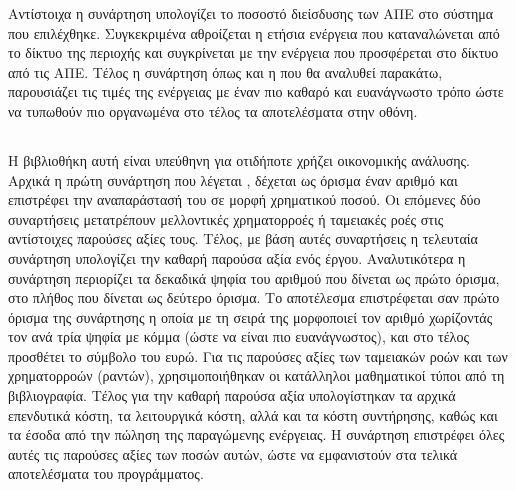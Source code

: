 \documentclass[12pt]{report}
\begin{document}
Αντίστοιχα η συνάρτηση {\textbf{{}}} υπολογίζει το ποσοστό διείσδυσης των ΑΠΕ στο σύστημα που επιλέχθηκε. Συγκεκριμένα αθροίζεται η ετήσια ενέργεια που καταναλώνεται από το δίκτυο της περιοχής
και συγκρίνεται με την ενέργεια που προσφέρεται στο δίκτυο από τις ΑΠΕ. Τέλος η συνάρτηση {\textbf{{}}} όπως και η {\textbf{{}}} που θα αναλυθεί παρακάτω, παρουσιάζει τις τιμές της ενέργειας
με έναν πιο καθαρό και ευανάγνωστο τρόπο ώστε να τυπωθούν πιο οργανωμένα στο τέλος τα αποτελέσματα στην οθόνη.

{}

\subsection{{}}
Η βιβλιοθήκη αυτή είναι υπεύθηνη για οτιδήποτε χρήζει οικονομικής ανάλυσης. Αρχικά η πρώτη συνάρτηση που λέγεται {\textbf{{}}}, δέχεται ως όρισμα έναν αριθμό και επιστρέφει την αναπαράστασή του σε μορφή χρηματικού 
ποσού. Οι επόμενες δύο συναρτήσεις μετατρέπουν μελλοντικές χρηματορροές ή ταμειακές ροές στις αντίστοιχες παρούσες αξίες τους. Τέλος, με βάση αυτές συναρτήσεις η τελευταία συνάρτηση υπολογίζει την καθαρή παρούσα αξία ενός έργου.
Αναλυτικότερα η συνάρτηση {} περιορίζει τα δεκαδικά ψηφία του αριθμού που δίνεται ως πρώτο όρισμα, στο πλήθος που δίνεται ως δεύτερο όρισμα. Το αποτέλεσμα επιστρέφεται σαν πρώτο όρισμα της συνάρτησης
{} η οποία με τη σειρά της μορφοποιεί τον αριθμό χωρίζοντάς τον ανά τρία ψηφία με κόμμα (ώστε να είναι πιο ευανάγνωστος), και στο τέλος προσθέτει το σύμβολο του ευρώ. Για τις παρούσες αξίες των ταμειακών ροών και
των χρηματορροών (ραντών), χρησιμοποιήθηκαν οι κατάλληλοι μαθηματικοί τύποι από τη βιβλιογραφία. Τέλος για την καθαρή παρούσα αξία υπολογίστηκαν τα αρχικά επενδυτικά κόστη, τα λειτουργικά κόστη, αλλά και τα κόστη συντήρησης, καθώς
και τα έσοδα από την πώληση της παραγώμενης ενέργειας. Η συνάρτηση επιστρέφει όλες αυτές τις παρούσες αξίες των ποσών αυτών, ώστε να εμφανιστούν στα τελικά αποτελέσματα του προγράμματος.
\end{document}
